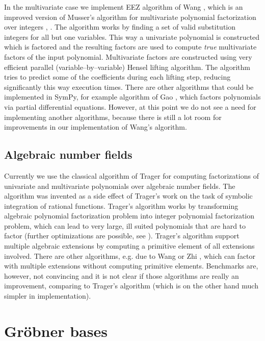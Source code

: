 In the multivariate case we implement EEZ algorithm of Wang \cite{Wang1978improved}, which is an improved
version of Musser's algorithm for multivariate polynomial factorization over integers \cite{Musser1975factor},
\cite{Wang1975integers}. The algorithm works by finding a set of valid substitution integers for all but
one variables. This way a univariate polynomial is constructed which is factored and the resulting
factors are used to compute \emph{true} multivariate factors of the input polynomial. Multivariate factors
are constructed using very efficient parallel (variable--by--variable) Hensel lifting algorithm. The
algorithm tries to predict some of the coefficients during each lifting step, reducing significantly
this way execution times. There are other algorithms that could be implemented in SymPy, for example
algorithm of Gao \cite{Gao2003partial}, which factors polynomials via partial differential equations.
However, at this point we do not see a need for implementing another algorithms, because there is
still a lot room for improvements in our implementation of Wang's algorithm.
\subsection{Algebraic number fields}\label{thesis-algebraic}

Currently we use the classical algorithm of Trager \cite{Trager1976algebraic} for computing factorizations
of univariate and multivariate polynomials over algebraic number fields. The algorithm was invented as
a side effect of Trager's work on the task of symbolic integration of rational functions. Trager's
algorithm works by transforming algebraic polynomial factorization problem into integer polynomial
factorization problem, which can lead to very large, ill suited polynomials that are hard to factor
(further optimizations are possible, see \cite{Encarnacion1997norms}). Trager's algorithm support multiple
algebraic extensions by computing a primitive element of all extensions involved. There are other
algorithms, e.g. due to Wang \cite{Wang1976algebraic} or Zhi \cite{Zhi1997optimal}, which can factor with
multiple extensions without computing primitive elements. Benchmarks are, however, not convincing
and it is not clear if those algorithms are really an improvement, comparing to Trager's algorithm
(which is on the other hand much simpler in implementation).


\section{Gröbner bases}

